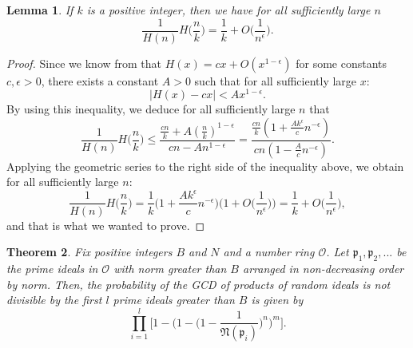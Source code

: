 \documentclass[12pt]{amsart}
\newtheorem{theorem}{Theorem}[subsection]
\newtheorem{lemma}[theorem]{Lemma}
\theoremstyle{definition}
\begin{document}
\begin{lemma} If $k$ is a positive integer, then we have for all sufficiently large $n$
	$$\frac{1}{H(n)} H\Big(\frac{n}{k}\Big) = \frac{1}{k} + O\Big(\frac{1}{n^{\epsilon}}\Big).$$
\end{lemma}

\begin{proof}
	Since we know from \cite{Marcus} that $H(x) = cx + O(x^{1-\epsilon})$ for some constants $c, \epsilon > 0$, there exists a constant $A > 0$ such that for all sufficiently large $x$:
	$$|H(x) - cx| < Ax^{1-\epsilon}.$$
	By using this inequality, we deduce for all sufficiently large $n$ that
	$$\frac{1}{H(n)} H\Big(\frac{n}{k}\Big) \leq \frac{\frac{cn}{k} + A(\frac{n}{k})^{1-\epsilon}}{cn - An^{1-\epsilon}} = \frac{\frac{cn}{k} (1 + \frac{Ak^{\epsilon}}{c} n^{-\epsilon})}{cn(1 - \frac{A}{c}n^{-\epsilon})}.$$
	Applying the geometric series to the right side of the inequality above, we obtain for all sufficiently large $n$:
	$$\frac{1}{H(n)} H\Big(\frac{n}{k}\Big) = \frac{1}{k} \Big(1 + \frac{Ak^{\epsilon}}{c} n^{-\epsilon}\Big) \Big(1 + O\Big(\frac{1}{n^{\epsilon}}\Big)\Big) = \frac{1}{k} + O\Big(\frac{1}{n^{\epsilon}}\Big),$$
	and that is what we wanted to prove.
\end{proof}

\begin{theorem}
	Fix positive integers $B$ and $N$ and a number ring $\mathcal{O}$. Let $\mathfrak{p}_1, \mathfrak{p}_2, ...$ be the prime ideals in $\mathcal{O}$ with norm greater than $B$ arranged in non-decreasing order by norm. Then, the probability of the GCD of products of random ideals is not divisible by the first $l$ prime ideals greater than $B$ is given by 
	$$\prod_{i=1}^{l} \Big[1 - \Big(1 - \Big(1-\frac{1}{\mathfrak{N}(\mathfrak{p}_i)}\Big)^n\Big)^m\Big].$$
\end{theorem}
\end{document}
